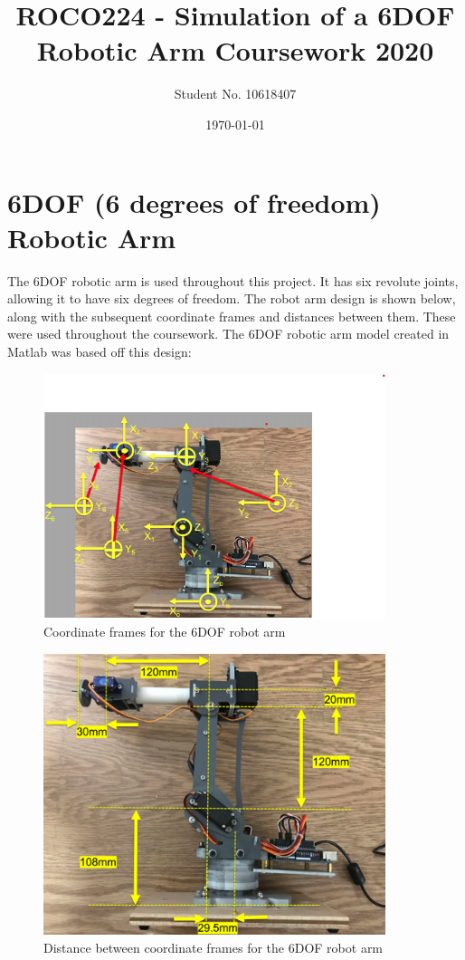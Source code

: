 \documentclass [11pt]{report}
\begin{document}
							
\title{\bf ROCO224 - Simulation of a 6DOF Robotic Arm Coursework 2020} 	
\author{Student No. 10618407} 								
\date{\today} 										
\maketitle 												
{}						
\setcounter{page}{2}								
\tableofcontents 																	

\chapter{6DOF (6 degrees of freedom) Robotic Arm}
			

The 6DOF robotic arm is used throughout this project. It has six revolute joints, allowing it to have six degrees of freedom. The robot arm design is shown below, along with the subsequent coordinate frames and distances between them. These were used throughout the coursework. The 6DOF robotic arm model created in Matlab was based off this design: 


\begin{figure}[H]
\centerline{\includegraphics[width=10cm]{6DOFcoordinateframes.png}}
\caption{Coordinate frames for the 6DOF robot arm}
\label{fig}
\end{figure}

\begin{figure}[H]
\centerline{\includegraphics[width=10cm]{6DOFlengths.png}}
\caption{Distance between coordinate frames for the 6DOF robot arm}
\label{fig}
\end{figure}
\end{document}
